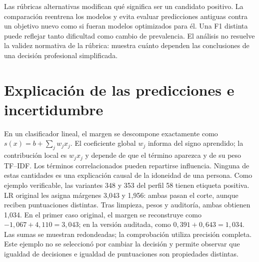 \documentclass[11pt,a4paper,oneside]{report}
\begin{document}
Las rúbricas alternativas modifican qué significa ser un candidato positivo. La comparación reentrena los modelos y evita evaluar predicciones antiguas contra un objetivo nuevo como si fueran modelos optimizados para él. Una F1 distinta puede reflejar tanto dificultad como cambio de prevalencia. El análisis no resuelve la validez normativa de la rúbrica: muestra cuánto dependen las conclusiones de una decisión profesional simplificada.

\section{Explicación de las predicciones e incertidumbre}
En un clasificador lineal, el margen se descompone exactamente como $s(x)=b+\sum_j w_jx_j$. El coeficiente global $w_j$ informa del signo aprendido; la contribución local es $w_jx_j$ y depende de que el término aparezca y de su peso TF--IDF. Los términos correlacionados pueden repartirse influencia. Ninguna de estas cantidades es una explicación causal de la idoneidad de una persona.
Como ejemplo verificable, las variantes 348 y 353 del perfil 58 tienen etiqueta positiva. LR original les asigna márgenes 3,043 y 1,956: ambas pasan el corte, aunque reciben puntuaciones distintas. Tras limpieza, pesos y auditoría, ambas obtienen 1,034. En el primer caso original, el margen se reconstruye como $-1{,}067+4{,}110=3{,}043$; en la versión auditada, como $0{,}391+0{,}643=1{,}034$. Las sumas se muestran redondeadas; la comprobación utiliza precisión completa. Este ejemplo no se seleccionó por cambiar la decisión y permite observar que igualdad de decisiones e igualdad de puntuaciones son propiedades distintas.
\end{document}
